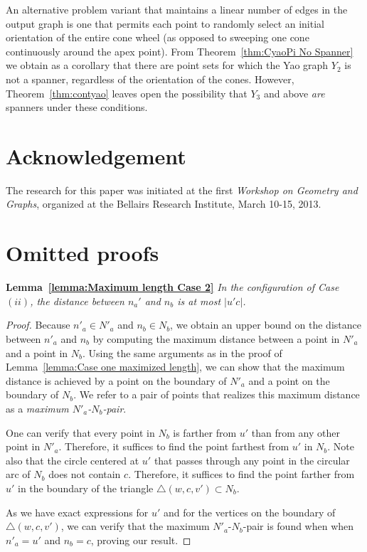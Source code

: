 \documentclass{cccg14}
\begin{document}
An alternative problem variant that maintains a linear number of edges in the output graph is one that permits each point to randomly select an  initial orientation of the entire cone wheel (as opposed to sweeping one cone continuously around the apex point). 
From Theorem~\ref{thm:CyaoPi No Spanner} we obtain as a corollary that there are point sets for which the Yao graph $Y_2$ is not a spanner, regardless of the orientation of the cones.
However, Theorem~\ref{thm:contyao} leaves open the possibility that $Y_3$ and above \emph{are} spanners under these conditions.






\section*{Acknowledgement}

The research for this paper was initiated at the first \emph{Workshop on Geometry and Graphs}, organized at the Bellairs Research Institute, March 10-15, 2013.



\small



\newpage
\appendix

\section{Omitted proofs}\label{Appendix}

\textbf{Lemma~\ref{lemma:Maximum length Case 2}}\emph{
In the configuration of Case $(ii)$, the distance between $n_a'$ and $n_b$ is at most $|u'c|$.
}
\begin{proof}
Because $n'_a\in N'_a$ and $n_b\in N_b$, we obtain an upper bound on the distance between $n'_a$ and $n_b$ by computing the maximum distance between a point in $N'_a$ and a point in $N_b$.
Using the same arguments as in the proof of Lemma~\ref{lemma:Case one maximized length}, we can show that the maximum distance is achieved by a point on the boundary of $N'_a$ and a point on the boundary of $N_b$.
We refer to a pair of points that realizes this maximum distance as a \emph{maximum $N'_a$-$N_b$-pair}.

One can verify that every point in $N_b$ is farther from $u'$ than from any other point in $N'_a$. Therefore, it suffices to find the point farthest from $u'$ in $N_b$. Note also that the circle centered at $u'$ that passes through any point in the circular arc of $N_b$ does not contain $c$. Therefore, it suffices to find the point farther from $u'$ in the boundary of the triangle $\triangle(w, c, v')\subset N_b$.

As we have exact expressions for $u'$ and for the vertices on the boundary of $\triangle(w, c, v')$, we can verify that the maximum $N'_a$-$N_b$-pair is found when when $n'_a = u'$ and $n_b = c$, proving our result.\end{proof}
\end{document}
